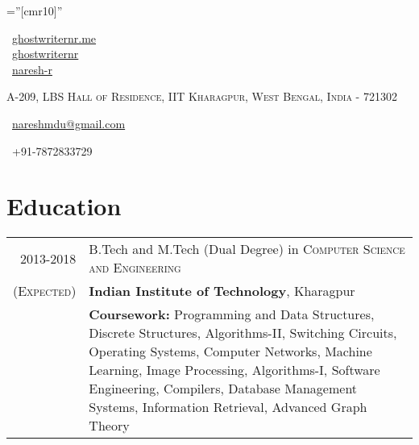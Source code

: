 \documentclass[a4paper,10pt]{extarticle} %
\begin{document}
\pagestyle{empty} %

\font\fb=''[cmr10]'' %

\begin{multicols}{3}
\normalsize  \faGlobe\ {\href{http://ghostwriternr.me/}{ghostwriternr.me}}\\
\normalsize \faGithub\ {\href{https://github.com/ghostwriternr}{ghostwriternr}}\\
\normalsize  \faLinkedinSquare\ {\href{https://www.linkedin.com/in/naresh-r-464a8b8b}{naresh-r}}\\
\columnbreak
\normalsize\par{\par} %
\par{\centering\normalsize {\textsc{A-209, LBS Hall of Residence, IIT Kharagpur, West Bengal, India - 721302}}\hfill\par}
\columnbreak
\raggedright\hfill\normalsize \faEnvelope\ {\href{mailto:nareshmdu@gmail.com}{nareshmdu@gmail.com}}\\
\raggedright\hfill{\faPhone\ +91-7872833729}
\end{multicols}


\section{Education}

\begin{tabular}{r|p{17cm}}	
2013-2018 & B.Tech and M.Tech (Dual Degree) in \textsc{Computer Science and Engineering}\\
\textsc{(Expected)}&\textbf{Indian Institute of Technology}, Kharagpur\\
&\textbf{Coursework: }{Programming and Data Structures, Discrete Structures, Algorithms-II, Switching Circuits, Operating Systems, Computer Networks, Machine Learning, Image Processing, Algorithms-I, Software Engineering, Compilers, Database Management Systems, Information Retrieval, Advanced Graph Theory}
\end{tabular}
\end{document}
